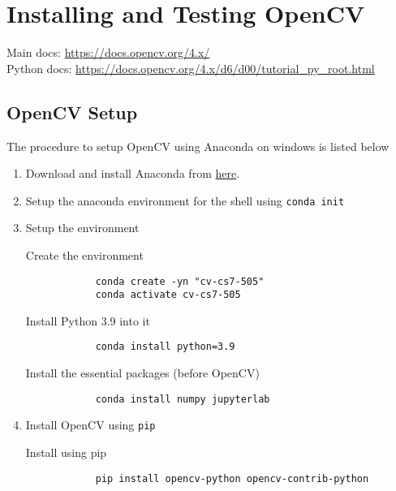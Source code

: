\section{Installing and Testing OpenCV}

Main docs: \url{https://docs.opencv.org/4.x/}
\\ \noindent
Python docs: \url{https://docs.opencv.org/4.x/d6/d00/tutorial_py_root.html}

\subsection{OpenCV Setup}

The procedure to setup OpenCV using Anaconda on windows is listed below

\begin{enumerate}
    \item Download and install Anaconda from \href{https://www.anaconda.com/products/individual}{here}.

    \item Setup the anaconda environment for the shell using \texttt{conda init}

    \item Setup the environment
    
        Create the environment
        \begin{verbatim}
            conda create -yn "cv-cs7-505"
            conda activate cv-cs7-505
        \end{verbatim}

        Install Python 3.9 into it
        \begin{verbatim}
            conda install python=3.9
        \end{verbatim}

        Install the essential packages (before OpenCV)
        \begin{verbatim}
            conda install numpy jupyterlab
        \end{verbatim}

    \item Install OpenCV using \texttt{pip}
    
        Install using pip
        \begin{verbatim}
            pip install opencv-python opencv-contrib-python
        \end{verbatim}

\end{enumerate}

